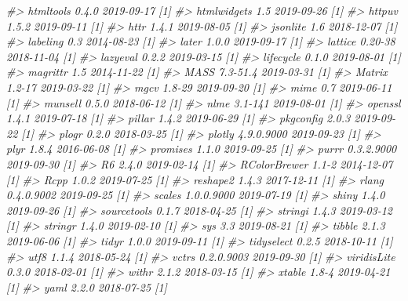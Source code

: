 \documentclass[
  12pt,
]{krantz}
\newenvironment{Shaded}{\begin{snugshade}}{\end{snugshade}}
\newcommand{\CommentTok}[1]{\textcolor[rgb]{0.56,0.35,0.01}{\textit{#1}}}
\begin{document}
\begin{Shaded}
\begin{Highlighting}[]
\CommentTok{#>  htmltools      0.4.0      2019-09-17 [1]}
\CommentTok{#>  htmlwidgets    1.5        2019-09-26 [1]}
\CommentTok{#>  httpuv         1.5.2      2019-09-11 [1]}
\CommentTok{#>  httr           1.4.1      2019-08-05 [1]}
\CommentTok{#>  jsonlite       1.6        2018-12-07 [1]}
\CommentTok{#>  labeling       0.3        2014-08-23 [1]}
\CommentTok{#>  later          1.0.0      2019-09-17 [1]}
\CommentTok{#>  lattice        0.20-38    2018-11-04 [1]}
\CommentTok{#>  lazyeval       0.2.2      2019-03-15 [1]}
\CommentTok{#>  lifecycle      0.1.0      2019-08-01 [1]}
\CommentTok{#>  magrittr       1.5        2014-11-22 [1]}
\CommentTok{#>  MASS           7.3-51.4   2019-03-31 [1]}
\CommentTok{#>  Matrix         1.2-17     2019-03-22 [1]}
\CommentTok{#>  mgcv           1.8-29     2019-09-20 [1]}
\CommentTok{#>  mime           0.7        2019-06-11 [1]}
\CommentTok{#>  munsell        0.5.0      2018-06-12 [1]}
\CommentTok{#>  nlme           3.1-141    2019-08-01 [1]}
\CommentTok{#>  openssl        1.4.1      2019-07-18 [1]}
\CommentTok{#>  pillar         1.4.2      2019-06-29 [1]}
\CommentTok{#>  pkgconfig      2.0.3      2019-09-22 [1]}
\CommentTok{#>  plogr          0.2.0      2018-03-25 [1]}
\CommentTok{#>  plotly         4.9.0.9000 2019-09-23 [1]}
\CommentTok{#>  plyr           1.8.4      2016-06-08 [1]}
\CommentTok{#>  promises       1.1.0      2019-09-25 [1]}
\CommentTok{#>  purrr          0.3.2.9000 2019-09-30 [1]}
\CommentTok{#>  R6             2.4.0      2019-02-14 [1]}
\CommentTok{#>  RColorBrewer   1.1-2      2014-12-07 [1]}
\CommentTok{#>  Rcpp           1.0.2      2019-07-25 [1]}
\CommentTok{#>  reshape2       1.4.3      2017-12-11 [1]}
\CommentTok{#>  rlang          0.4.0.9002 2019-09-25 [1]}
\CommentTok{#>  scales         1.0.0.9000 2019-07-19 [1]}
\CommentTok{#>  shiny          1.4.0      2019-09-26 [1]}
\CommentTok{#>  sourcetools    0.1.7      2018-04-25 [1]}
\CommentTok{#>  stringi        1.4.3      2019-03-12 [1]}
\CommentTok{#>  stringr        1.4.0      2019-02-10 [1]}
\CommentTok{#>  sys            3.3        2019-08-21 [1]}
\CommentTok{#>  tibble         2.1.3      2019-06-06 [1]}
\CommentTok{#>  tidyr          1.0.0      2019-09-11 [1]}
\CommentTok{#>  tidyselect     0.2.5      2018-10-11 [1]}
\CommentTok{#>  utf8           1.1.4      2018-05-24 [1]}
\CommentTok{#>  vctrs          0.2.0.9003 2019-09-30 [1]}
\CommentTok{#>  viridisLite    0.3.0      2018-02-01 [1]}
\CommentTok{#>  withr          2.1.2      2018-03-15 [1]}
\CommentTok{#>  xtable         1.8-4      2019-04-21 [1]}
\CommentTok{#>  yaml           2.2.0      2018-07-25 [1]}

\end{Highlighting}
\end{Shaded}
\end{document}
